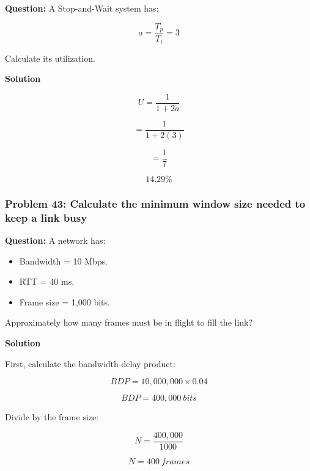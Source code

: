 \textbf{Question:} A Stop-and-Wait system has:



\[
a=\frac{T_p}{T_t}=3
\]



Calculate its utilization.

\textbf{Solution}



\[
U=\frac{1}{1+2a}
\]





\[
=\frac{1}{1+2(3)}
\]





\[
=\frac{1}{7}
\]





\[
\boxed{14.29\%}
\]



\subsubsection*{Problem 43: Calculate the minimum window size needed to keep a link busy}

\textbf{Question:} A network has:

\begin{itemize}
\item Bandwidth = 10 Mbps.
\item RTT = 40 ms.
\item Frame size = 1,000 bits.
\end{itemize}

Approximately how many frames must be in flight to fill the link?

\textbf{Solution}

First, calculate the bandwidth-delay product:



\[
BDP=10,000,000\times0.04
\]





\[
BDP=400,000\ bits
\]



Divide by the frame size:



\[
N=\frac{400,000}{1000}
\]





\[
\boxed{N=400\ frames}
\]




